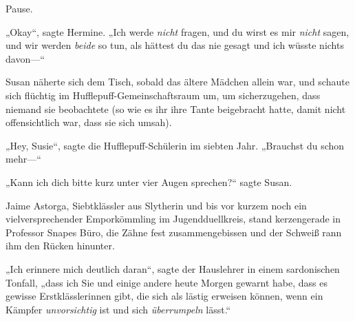 Pause.

„Okay“, sagte Hermine. „Ich werde \emph{nicht} fragen, und du wirst es mir \emph{nicht} sagen, und wir werden \emph{beide} so tun, als hättest du das nie gesagt und ich wüsste nichts davon—“

\later

Susan näherte sich dem Tisch, sobald das ältere Mädchen allein war, und schaute sich flüchtig im Hufflepuff-Gemeinschaftsraum um, um sicherzugehen, dass niemand sie beobachtete (so wie es ihr ihre Tante beigebracht hatte, damit nicht offensichtlich war, dass sie sich umsah).

„Hey, Susie“, sagte die Hufflepuff-Schülerin im siebten Jahr. „Brauchst du schon mehr—“

„Kann ich dich bitte kurz unter vier Augen sprechen?“ sagte Susan.

\later

Jaime Astorga, Siebtklässler aus Slytherin und bis vor kurzem noch ein vielversprechender Emporkömmling im Jugendduellkreis, stand kerzengerade in Professor Snapes Büro, die Zähne fest zusammengebissen und der Schweiß rann ihm den Rücken hinunter.

„Ich erinnere mich deutlich daran“, sagte der Hauslehrer in einem sardonischen Tonfall, „dass ich Sie und einige andere heute Morgen gewarnt habe, dass es gewisse Erstklässlerinnen gibt, die sich als lästig erweisen können, wenn ein Kämpfer \emph{unvorsichtig} ist und sich \emph{überrumpeln} lässt.“

